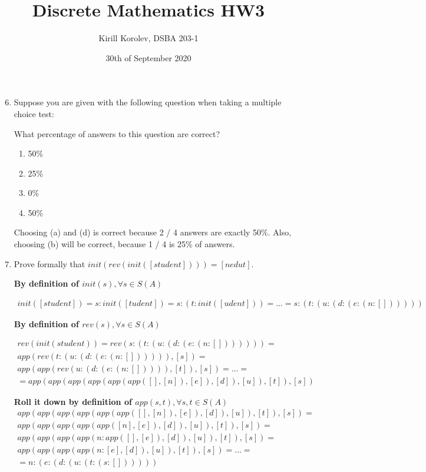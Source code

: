 \documentclass{article}
\title{Discrete Mathematics HW3}
\author{Kirill Korolev, DSBA 203-1}
\date{30th of September 2020}
\begin{document}
\maketitle

\begin{enumerate}
\setcounter{enumi}{5}

\item Suppose you are given with the following question when taking a multiple choice test:

What percentage of answers to this question are correct?

\begin{enumerate}
\item 50\%
\item 25\%
\item 0\%
\item 50\%
\end{enumerate}

Choosing (a) and (d) is correct because 2 / 4 answers are exactly 50\%. Also, choosing (b) will be correct, because 1 / 4 is 25\% of answers.

\item Prove formally that $init(rev(init([student]))) = [nedut]$.

\textbf{By definition of $init(s), \forall s \in S(A)$}

\begin{align*}
init([student]) = s : init([tudent]) = s : (t : init([udent])) = ... = s : (t : (u : (d : (e : (n : [])))))
\end{align*}

\textbf{By definition of $rev(s), \forall s \in S(A)$}

\begin{align*}
rev(init(student)) = rev(s : (t : (u : (d : (e : (n : [])))))) =\\
app(rev(t : (u : (d : (e : (n : []))))), [s]) =\\ app(app(rev(u : (d : (e : (n : [])))), [t]), [s]) = ... = \\ = app(app(app(app(app(app([], [n]), [e]), [d]), [u]), [t]), [s]) 
\end{align*}

\textbf{Roll it down by definition of $app(s, t), \forall s, t \in S(A)$}
\begin{align*}
app(app(app(app(app(app([], [n]), [e]), [d]), [u]), [t]), [s]) =\\
app(app(app(app(app([n], [e]), [d]), [u]), [t]), [s]) = \\
app(app(app(app(n: app([], [e]), [d]), [u]), [t]), [s]) = \\
app(app(app(app(n: [e], [d]), [u]), [t]), [s]) = ... = \\
= n : (e : (d : (u : (t : (s : [])))))
\end{align*}


\end{enumerate}
\end{document}
